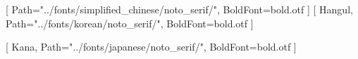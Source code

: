 \usepackage{xeCJK}
[
    Path="../fonts/simplified_chinese/noto_serif/",
    BoldFont=bold.otf
]
[
    Hangul,
    Path="../fonts/korean/noto_serif/",
    BoldFont=bold.otf
]

[
    Kana,
    Path="../fonts/japanese/noto_serif/",
    BoldFont=bold.otf
]
